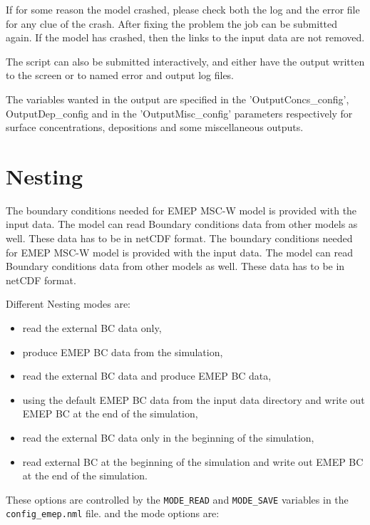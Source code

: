 \documentclass[a4paper,12pt]{report}
\begin{document}
If for some reason the model crashed, please check both the log and the error 
file for any clue of the crash. After fixing the problem the job can be 
submitted again. If the model has crashed, then the links to the input data 
are not removed. 

The script can also be submitted interactively, and either have the output 
written to the screen or to named error and output log files. 


The variables wanted in the output are specified in the 'OutputConcs\_config', 
OutputDep\_config and in the 'OutputMisc\_config' parameters respectively for 
surface concentrations, depositions and some miscellaneous outputs.  


\section{Nesting}
\label{sec:nesting}

The boundary conditions needed for EMEP  MSC-W model is provided with the input data. 
The model can read Boundary conditions data from other models as well.  These data has
to be in netCDF format.  The boundary conditions needed for EMEP  MSC-W model is provided with the 	input data.  The model can read Boundary conditions data from other models as well. 
These data has to be in netCDF format.  

Different Nesting modes are:

\begin{itemize}			
\item read the external BC data only,
\item produce EMEP BC data from the simulation, 
\item read the external BC data and produce EMEP BC data, 
\item using the default EMEP BC data from the input data directory and write out EMEP BC at the end of the simulation, 
\item read the external BC data only in the beginning of the simulation,
\item read external BC at the beginning of the simulation and write out EMEP BC at the end of the simulation.   	
\end{itemize}	

These options are controlled by the {\tt MODE\_READ} and {\tt MODE\_SAVE} variables  in the {\tt config\_emep.nml} file. and the mode options are:
\end{document}
